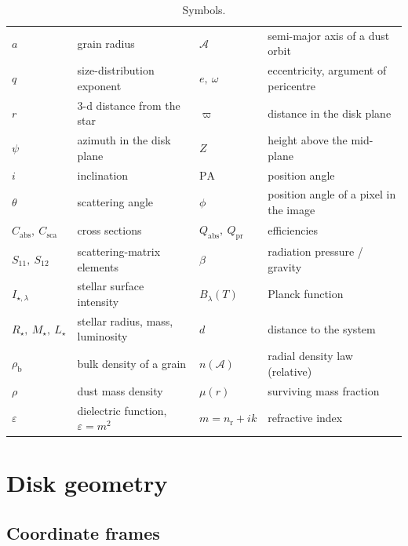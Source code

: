\documentclass[11pt,a4paper]{article}
\begin{document}
\begin{table}[h]
\centering
\caption{Symbols.}
\label{tab:notation}
\small
\begin{tabular}{@{}ll@{\qquad}ll@{}}
\toprule
$a$ & grain radius & $\mathcal{A}$ & semi-major axis of a dust orbit \\
$q$ & size-distribution exponent & $e,\ \omega$ & eccentricity, argument of pericentre \\
$r$ & 3-d distance from the star & $\varpi$ & distance in the disk plane \\
$\psi$ & azimuth in the disk plane & $Z$ & height above the mid-plane \\
$i$ & inclination & $\mathrm{PA}$ & position angle \\
$\theta$ & scattering angle & $\phi$ & position angle of a pixel in the image \\
$C_\mathrm{abs},\ C_\mathrm{sca}$ & cross sections & $Q_\mathrm{abs},\ Q_\mathrm{pr}$ & efficiencies \\
$S_{11},\ S_{12}$ & scattering-matrix elements & $\beta$ & radiation pressure / gravity \\
$I_{\star,\lambda}$ & stellar surface intensity & $B_\lambda(T)$ & Planck function \\
$R_\star,\ M_\star,\ L_\star$ & stellar radius, mass, luminosity & $d$ & distance to the system \\
$\rho_\mathrm{b}$ & bulk density of a grain & $n(\mathcal{A})$ & radial density law (relative) \\
$\rho$ & dust mass density & $\mu(r)$ & surviving mass fraction \\
$\varepsilon$ & dielectric function, $\varepsilon=m^2$ & $m = n_\mathrm{r}+ik$ & refractive index \\
\bottomrule
\end{tabular}
\end{table}

\section{Disk geometry}
\label{sec:geometry}

\subsection{Coordinate frames}
\end{document}
